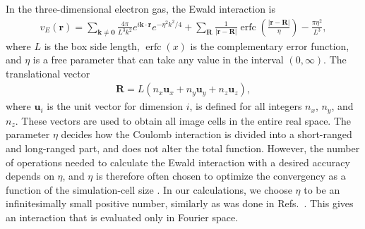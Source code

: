 \documentclass[a4paper,12pt]{report}
\DeclareMathOperator\erfc{erfc}
\begin{document}
In the three-dimensional electron gas, the Ewald 
interaction is \cite{drummond2008}
\begin{align}
  v_{E}(\mathbf{r}) = \sum_{\mathbf{k} \neq \mathbf{0}}
  \frac{4\pi }{L^{3}k^{2}}e^{i\mathbf{k}\cdot \mathbf{r}}
  e^{-\eta^{2}k^{2}/4}
  + \sum_{\mathbf{R}}\frac{1}{\left| \mathbf{r}
    -\mathbf{R}\right| } \erfc \left( \frac{\left| 
    \mathbf{r}-\mathbf{R}\right|}{\eta }\right)
  - \frac{\pi \eta^{2}}{L^{3}},
\end{align}
where $L$ is the box side length, $\erfc(x)$ is the 
complementary error function, and $\eta $ is a free
parameter that can take any value in the interval 
$(0, \infty )$. The translational vector 
\begin{align}
  \mathbf{R} = L\left(n_{x}\mathbf{u}_{x} + n_{y}
  \mathbf{u}_{y} + n_{z}\mathbf{u}_{z}\right) ,
\end{align}
where $\mathbf{u}_{i}$ is the unit vector for dimension $i$,
is defined for all integers $n_{x}$, $n_{y}$, and 
$n_{z}$. These vectors are used to obtain all image
cells in the entire real space. 
The parameter $\eta $ decides how 
the Coulomb interaction is divided into a short-ranged
and long-ranged part, and does not alter the total
function. However, the number of operations needed
to calculate the Ewald interaction with a desired 
accuracy depends on $\eta $, and $\eta $ is therefore 
often chosen to optimize the convergency as a function
of the simulation-cell size \cite{drummond2008}. In
our calculations, we choose $\eta $ to be an infinitesimally
small positive number, similarly as was done in 
Refs.~\cite{shepherd_2012b,shepherd2013a,shepherd2013b,
shepherd2013c,roggero2013}.
This gives an interaction that is evaluated only in
Fourier space. 
\end{document}
